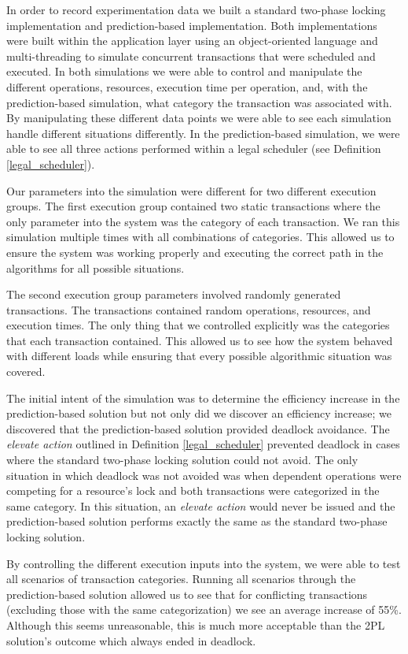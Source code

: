 In order to record experimentation data we built a standard two-phase locking implementation and prediction-based implementation. Both implementations were built within the application layer using an object-oriented language and multi-threading to simulate concurrent transactions that were scheduled and executed. In both simulations we were able to control and manipulate the different operations, resources, execution time per operation, and, with the prediction-based simulation, what category the transaction was associated with. By manipulating these different data points we were able to see each simulation handle different situations differently. In the prediction-based simulation, we were able to see all three actions performed within a legal scheduler (see Definition \ref{legal_scheduler}).

Our parameters into the simulation were different for two different execution groups. The first execution group contained two static transactions where the only parameter into the system was the category of each transaction. We ran this simulation multiple times with all combinations of categories. This allowed us to ensure the system was working properly and executing the correct path in the algorithms for all possible situations.

The second execution group parameters involved randomly generated transactions. The transactions contained random operations, resources, and execution times. The only thing that we controlled explicitly was the categories that each transaction contained. This allowed us to see how the system behaved with different loads while ensuring that every possible algorithmic situation was covered.

The initial intent of the simulation was to determine the efficiency increase in the prediction-based solution but not only did we discover an efficiency increase; we discovered that the prediction-based solution provided deadlock avoidance. The \textit{elevate action} outlined in Definition \ref{legal_scheduler} prevented deadlock in cases where the standard two-phase locking solution could not avoid. The only situation in which deadlock was not avoided was when dependent operations were competing for a resource's lock and both transactions were categorized in the same category. In this situation, an \textit{elevate action} would never be issued and the prediction-based solution performs exactly the same as the standard two-phase locking solution.

By controlling the different execution inputs into the system, we were able to test all scenarios of transaction categories. Running all scenarios through the prediction-based solution allowed us to see that for conflicting transactions (excluding those with the same categorization) we see an average increase of 55\%. Although this seems unreasonable, this is much more acceptable than the 2PL solution's outcome which always ended in deadlock.

